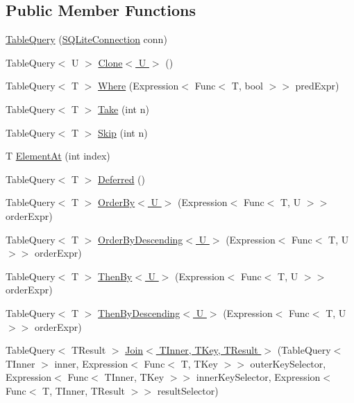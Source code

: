 \subsection*{Public Member Functions}
\begin{DoxyCompactItemize}
\item 
\hyperlink{class_s_q_lite_1_1_table_query_3_01_t_01_4_a2e3874f45af10a8c44db821c7a848aab}{Table\+Query} (\hyperlink{class_s_q_lite_1_1_s_q_lite_connection}{S\+Q\+Lite\+Connection} conn)
\item 
Table\+Query$<$ U $>$ \hyperlink{class_s_q_lite_1_1_table_query_3_01_t_01_4_a744de6c9fda8bf39de015ae41c0b2cb3}{Clone$<$ U $>$} ()
\item 
Table\+Query$<$ T $>$ \hyperlink{class_s_q_lite_1_1_table_query_3_01_t_01_4_aafcda8a0d85fc7708bc29cc1ae254be5}{Where} (Expression$<$ Func$<$ T, bool $>$$>$ pred\+Expr)
\item 
Table\+Query$<$ T $>$ \hyperlink{class_s_q_lite_1_1_table_query_3_01_t_01_4_abc1454c5581e01ee57873a8c59101d5c}{Take} (int n)
\item 
Table\+Query$<$ T $>$ \hyperlink{class_s_q_lite_1_1_table_query_3_01_t_01_4_a4bf49d4c603ea8a6db6d65e51bdd6458}{Skip} (int n)
\item 
T \hyperlink{class_s_q_lite_1_1_table_query_3_01_t_01_4_a1adf19dc2456239c4b4a900995b2794d}{Element\+At} (int index)
\item 
Table\+Query$<$ T $>$ \hyperlink{class_s_q_lite_1_1_table_query_3_01_t_01_4_a158964fb1e56e6679ab94cf101dcc6b3}{Deferred} ()
\item 
Table\+Query$<$ T $>$ \hyperlink{class_s_q_lite_1_1_table_query_3_01_t_01_4_ae35684d62851a521aac3419af0c565fb}{Order\+By$<$ U $>$} (Expression$<$ Func$<$ T, U $>$$>$ order\+Expr)
\item 
Table\+Query$<$ T $>$ \hyperlink{class_s_q_lite_1_1_table_query_3_01_t_01_4_aacf40c5e9162c7f25ebdb78a2811aec9}{Order\+By\+Descending$<$ U $>$} (Expression$<$ Func$<$ T, U $>$$>$ order\+Expr)
\item 
Table\+Query$<$ T $>$ \hyperlink{class_s_q_lite_1_1_table_query_3_01_t_01_4_a8fd46c541dda61605ecdcada1684b9b7}{Then\+By$<$ U $>$} (Expression$<$ Func$<$ T, U $>$$>$ order\+Expr)
\item 
Table\+Query$<$ T $>$ \hyperlink{class_s_q_lite_1_1_table_query_3_01_t_01_4_a589fb8db3bbfe57b0f08aeea32e574ee}{Then\+By\+Descending$<$ U $>$} (Expression$<$ Func$<$ T, U $>$$>$ order\+Expr)
\item 
Table\+Query$<$ T\+Result $>$ \hyperlink{class_s_q_lite_1_1_table_query_3_01_t_01_4_a292ef3b90067c4393cf377c369d942a1}{Join$<$ T\+Inner, T\+Key, T\+Result $>$} (Table\+Query$<$ T\+Inner $>$ inner, Expression$<$ Func$<$ T, T\+Key $>$$>$ outer\+Key\+Selector, Expression$<$ Func$<$ T\+Inner, T\+Key $>$$>$ inner\+Key\+Selector, Expression$<$ Func$<$ T, T\+Inner, T\+Result $>$$>$ result\+Selector)

\end{DoxyCompactItemize}
